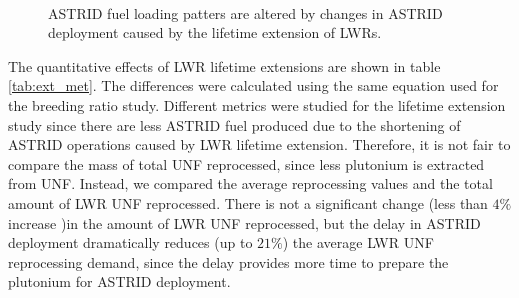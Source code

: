 \begin{figure}[!ht]
	\centering
	\quad
	\\
	\quad
	\caption{\gls{ASTRID} fuel loading patters are altered by changes in \gls{ASTRID} deployment
			 caused by the lifetime extension of \glspl{LWR}.}
	\label{fig:ext_fuel}
\end{figure}

The quantitative effects of
\gls{LWR} lifetime extensions are shown in table \ref{tab:ext_met}.
The differences were calculated using the same equation used for the
breeding ratio study. Different metrics were studied for the lifetime
extension study since there are less \gls{ASTRID} fuel produced due to
the shortening of \gls{ASTRID} operations caused by \gls{LWR} lifetime
extension. Therefore, it is not fair to compare the mass of total \gls{UNF} reprocessed,
since less plutonium is extracted from \gls{UNF}. Instead, we compared the
average reprocessing values and the total amount of \gls{LWR} \gls{UNF} reprocessed.
There is not a significant change (less than $4\%$ increase )in the amount of \gls{LWR}
\gls{UNF} reprocessed, but the delay in \gls{ASTRID} deployment
dramatically reduces (up to $21\%$) the average \gls{LWR} \gls{UNF} reprocessing demand, since 
the delay provides more time to prepare the plutonium for \gls{ASTRID} deployment.

